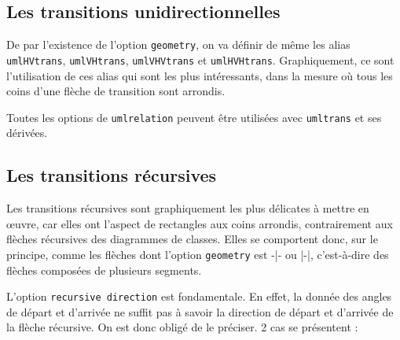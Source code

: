 \documentclass[a4paper,11pt]{report}
\newcommand{\inputTikZ}[1]{%
  }%
\newcommand{\inputTikZ}[1]{%
    \texttt{[image: fig/\#1.pdf]}%
  }%
\begin{document}
\subsection{Les transitions unidirectionnelles}\label{s.unitrans}

De par l'existence de l'option {\tt geometry}, on va définir de même les alias {\tt umlHVtrans}, {\tt umlVHtrans}, {\tt umlVHVtrans} et {\tt umlHVHtrans}. Graphiquement, ce sont l'utilisation de ces alias qui sont les plus intéressants, dans la mesure où tous les coins d'une flèche de transition sont arrondis.

\medskip

\begin{minipage}{0.51\textwidth}

\end{minipage}
\begin{minipage}{0.49\textwidth}
\begin{center}
\inputTikZ{figure55}
\end{center}
\end{minipage}

\medskip

Toutes les options de {\tt umlrelation} peuvent être utilisées avec {\tt umltrans} et ses dérivées.

\subsection{Les transitions récursives}\label{s.rectrans}

Les transitions récursives sont graphiquement les plus délicates à mettre en \oe{}uvre, car elles ont l'aspect de rectangles aux coins arrondis, contrairement aux flèches récursives des diagrammes de classes. Elles se comportent donc, sur le principe, comme les flèches dont l'option {\tt geometry} est -|- ou |-|, c'est-à-dire des flèches composées de plusieurs segments.

\medskip

\begin{minipage}{0.51\textwidth}

\end{minipage}
\begin{minipage}{0.49\textwidth}
\begin{center}
\inputTikZ{figure56}
\end{center}
\end{minipage}

\medskip

L'option {\tt recursive direction} est fondamentale. En effet, la donnée des angles de départ et d'arrivée ne suffit pas à savoir la direction de départ et d'arrivée de la flèche récursive. On est donc obligé de le préciser. 2 cas se présentent :
\end{document}
